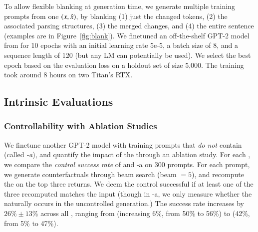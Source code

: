 To allow flexible blanking at generation time, we generate multiple training prompts from one $(x, \hat{x})$, by blanking (1) just the changed tokens, (2) the associated parsing structures, (3) the merged changes, and (4) the entire sentence (examples are in Figure~\ref{fig:blank}).
We finetuned an off-the-shelf GPT-2 model from \citet{Wolf2019HuggingFacesTS} for 10 epochs with an initial learning rate 5e-5, a batch size of 8, and a sequence length of 120 (but any LM can potentially be used).
We select the best epoch based on the evaluation loss on a holdout set of size 5,000.
The training took around 8 hours on two Titan's RTX.


\subsection{Intrinsic Evaluations}
\label{appendix:intrinsic}

\subsubsection{Controllability with Ablation Studies}
\label{appendix:ablation_control}



We finetune another GPT-2 model with training prompts that \emph{do not} contain \tagstrs (called \emph{\sysname-a}), and quantify the impact of the \tagstrshorts through an ablation study.
For each \tagstr, we compare the \emph{control success rate} of \sysname and \sysname-a on 300 prompts.
For each prompt, we generate counterfactuals through beam search (beam $=5$), and recompute the \tagstrshorts on the top three returns.
We deem the control successful if at least one of the three recomputed \tagstrshorts matches the input (though in \sysname-a, we only measure whether the \tagstrshort naturally occurs in the uncontrolled generation.)
The success rate increases by $26\% \pm 13\%$ across all \tagstrs, ranging from  (increasing 6\%, from 50\% to 56\%) to  (42\%, from 5\% to 47\%).


